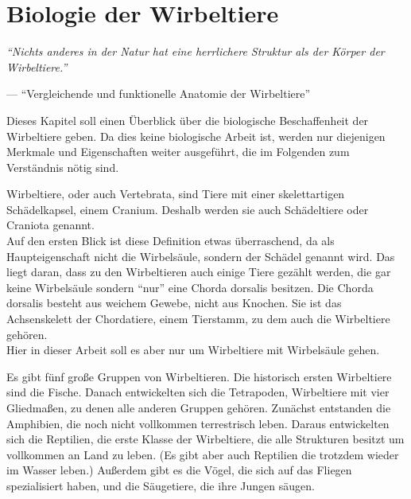 \chapter{Biologie der Wirbeltiere}
\label{chapter:biology}

\begin{center}
 \begin{minipage}{12cm}
  \emph{"`Nichts anderes in der Natur hat eine herrlichere Struktur als der Körper der Wirbeltiere."'}
 
  --- "`Vergleichende und funktionelle Anatomie der Wirbeltiere"' \cite[S.\ 1]{Vergleichende_Anatomie}
 \end{minipage}
\end{center}

Dieses Kapitel soll einen Überblick über die biologische Beschaffenheit der Wirbeltiere geben. Da dies keine biologische Arbeit ist, werden nur diejenigen Merkmale und Eigenschaften weiter ausgeführt, die im Folgenden zum Verständnis nötig sind.

Wirbeltiere, oder auch Vertebrata, sind Tiere mit einer skelettartigen Schädelkapsel, einem Cranium. Deshalb werden sie auch Schädeltiere oder Craniota genannt.\\
Auf den ersten Blick ist diese Definition etwas überraschend, da als  Haupteigenschaft nicht die Wirbelsäule, sondern der Schädel genannt wird. Das liegt daran, dass zu den Wirbeltieren auch einige Tiere gezählt werden, die gar keine Wirbelsäule sondern "`nur"' eine Chorda dorsalis besitzen. Die Chorda dorsalis besteht aus weichem Gewebe, nicht aus Knochen. Sie ist das Achsenskelett der Chordatiere, einem Tierstamm, zu dem auch die Wirbeltiere gehören. \cite[S.\ 27 f.]{Vergleichende_Anatomie}\\
Hier in dieser Arbeit soll es aber nur um Wirbeltiere mit Wirbelsäule gehen.

Es gibt fünf große Gruppen von Wirbeltieren. Die historisch ersten Wirbeltiere sind die Fische. Danach entwickelten sich die Tetrapoden, Wirbeltiere mit vier Gliedmaßen, zu denen alle anderen Gruppen gehören. Zunächst entstanden die Amphibien, die noch nicht vollkommen terrestrisch leben. Daraus entwickelten sich die Reptilien, die erste Klasse der Wirbeltiere, die alle Strukturen besitzt um vollkommen an Land zu leben. (Es gibt aber auch Reptilien die trotzdem wieder im Wasser leben.) Außerdem gibt es die Vögel, die sich auf das Fliegen spezialisiert haben, und die Säugetiere, die ihre Jungen säugen.\\
\cite[Kapitel 4]{Vergleichende_Anatomie}


